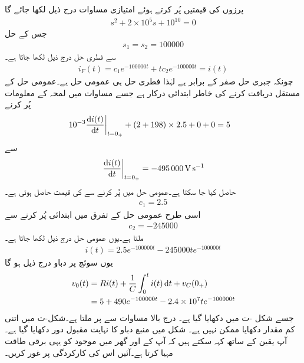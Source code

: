 پرزوں کی قیمتیں پُر کرتے ہوئے امتیازی مساوات درج ذیل لکھا جائے گا
\begin{align*}
s^2+2\times 10^5 s+10^{10}=0
\end{align*}
جس کے حل
\begin{align*}
s_1=s_2=\num{100000}
\end{align*}
سے فطری حل درج ذیل لکھا جاتا ہے۔
\begin{align*}
i_F(t)=c_1e^{-100000t}+t c_2e^{-100000t}=i(t)
\end{align*}
چونکہ جبری حل صفر کے برابر ہے لہٰذا فطری حل ہی عمومی حل  ہے۔عمومی حل کے مستقل دریافت کرنے کی خاطر ابتدائی  درکار  ہے جسے مساوات   میں لمحہ  کے معلومات پُر کرنے
\begin{align*}
\left. 10^{-3}\frac{\dif i(t)}{\dif t}\right|_{t=0_+}+(2+198)\times 2.5+0+0&=5
\end{align*}
سے
\begin{align*}
\left. \frac{\dif i(t)}{\dif t}\right|_{t=0_+}=\SI{-495000}{\volt\per\second}
\end{align*}
حاصل کیا جا سکتا ہے۔عمومی حل میں  پُر کرنے سے   کی قیمت حاصل ہوتی ہے۔
\begin{align*}
c_1=2.5
\end{align*}
اسی طرح عمومی حل کے تفرق میں ابتدائی  پُر کرنے سے
\begin{align*}
c_2=\num{-245000}
\end{align*}
ملتا ہے۔یوں عمومی حل درج ذیل لکھا جاتا ہے۔
\begin{align*}
i(t)=2.5e^{-100000t}-245000 t e^{-100000t}
\end{align*}
یوں سوئچ پر دباو درج ذیل ہو گا
\begin{align*}
v_0(t)&=Ri(t)+\frac{1}{C}\int_{0}^{t} i(t) \dif t+v_C(0_+)\\
&=5+490e^{-100000t}-2.4\times 10^7 t e^{-100000 t}
\end{align*}
جسے شکل -ت میں دکھایا گیا ہے۔ درج بالا مساوات سے  پر  ملتا ہے۔شکل-ت میں اتنی کم مقدار دکھایا ممکن نہیں ہے۔
شکل  میں منبع دباو کا نہایت مقبول دور دکھایا گیا ہے۔آپ یقین کے ساتھ کہہ سکتے ہیں کہ آپ کے  اور گھر میں موجود  کو یہی برقی طاقت مہیا کرتا ہے۔آئیں اس کی کارکردگی پر غور کریں۔
